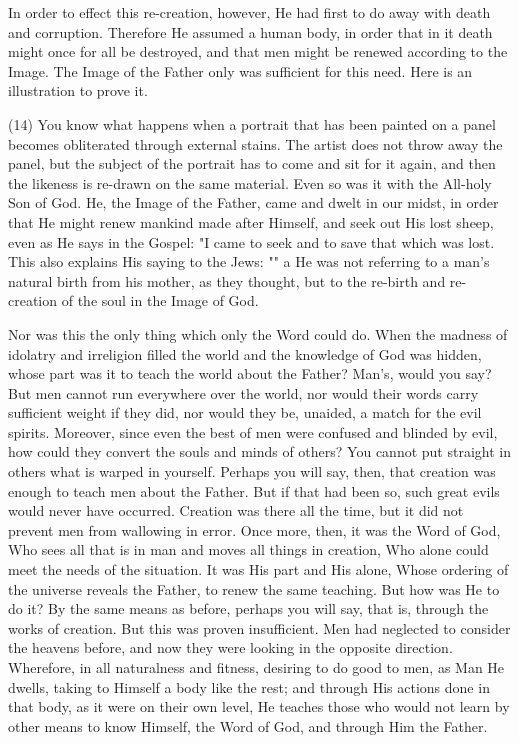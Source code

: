 \documentclass[9pt, twocolumn, oneside, a4paper]{memoir}
\begin{document}
In order to effect this re-creation, however, He had first to do away with       death and corruption. Therefore He assumed a human body, in order that in it       death might once for all be destroyed, and that men might be renewed according       to the Image. The Image of the Father only was sufficient for this need. Here is       an illustration to prove it.   

\textsc{(14)} You know what happens when a portrait that has       been painted on a panel becomes obliterated through external stains. The artist       does not throw away the panel, but the subject of the portrait has to come and       sit for it again, and then the likeness is re-drawn on the same material. Even       so was it with the All-holy Son of God. He, the Image of the Father, came and       dwelt in our midst, in order that He might renew mankind made after Himself, and       seek out His lost sheep, even as He says in the Gospel:       "I came to seek and to save that which was lost.       This also explains His saying to the Jews: ""       a He was not referring to a man's natural birth from his mother, as they thought,       but to the re-birth and re-creation of the soul in the Image of God.   

Nor was this the only thing which only the Word could do. When the madness of       idolatry and irreligion filled the world and the knowledge of God was hidden,       whose part was it to teach the world about the Father? Man's, would you say? But       men cannot run everywhere over the world, nor would their words carry sufficient       weight if they did, nor would they be, unaided, a match for the evil spirits.       Moreover, since even the best of men were confused and blinded by evil, how       could they convert the souls and minds of others? You cannot put straight in       others what is warped in yourself. Perhaps you will say, then, that creation was       enough to teach men about the Father. But if that had       been so, such great evils       would never have occurred. Creation was there all the time, but it did not       prevent men from wallowing in error. Once more, then, it was the Word of God,       Who sees all that is in man and moves all things in creation, Who alone could       meet the needs of the situation. It was His part and His alone, Whose ordering       of the universe reveals the Father, to renew the same teaching. But how was He       to do it? By the same means as before, perhaps you will say, that is, through       the works of creation. But this was proven insufficient. Men had neglected to       consider the heavens before, and now they were looking in the opposite       direction. Wherefore, in all naturalness and fitness, desiring to do good to       men, as Man He dwells, taking to Himself a body like the rest; and through His       actions done in that body, as it were on their own level, He teaches those who       would not learn by other means to know Himself, the Word of God, and through Him       the Father.   
\end{document}
